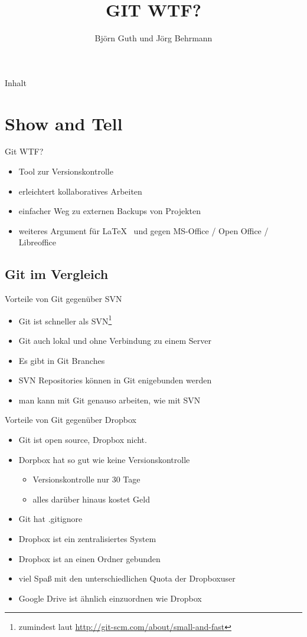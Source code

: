 \documentclass{beamer}
\title{GIT WTF?}
\author{Björn Guth und Jörg Behrmann}
\begin{document}
\frame[plain]{\titlepage}

\begin{frame}{Inhalt}
	\tableofcontents
\end{frame}

\section{Show and Tell}
\begin{frame}{Git WTF?}
	\begin{itemize}
		\item Tool zur Versionskontrolle
		\item erleichtert kollaboratives Arbeiten
		\item einfacher Weg zu externen Backups von Projekten
		\item weiteres Argument für \LaTeX~ und gegen MS-Office / Open Office / Libreoffice
	\end{itemize}
\end{frame}

\subsection{Git im Vergleich}
\begin{frame}{Vorteile von Git gegenüber SVN}
	\begin{itemize}
		\item Git ist schneller als SVN\footnote{zumindest laut \url{http://git-scm.com/about/small-and-fast}}
		\item Git auch lokal und ohne Verbindung zu einem Server
		\item Es gibt in Git Branches
		\item SVN Repositories können in Git enigebunden werden
		\item man kann mit Git genauso arbeiten, wie mit SVN
	\end{itemize}
\end{frame}

\begin{frame}{Vorteile von Git gegenüber Dropbox}
	\begin{itemize}
		\item Git ist open source, Dropbox nicht.
		\item Dorpbox hat so gut wie keine Versionskontrolle
			\begin{itemize}
				\item Versionskontrolle nur 30 Tage
				\item alles darüber hinaus kostet Geld
			\end{itemize}
		\item Git hat .gitignore
		\item Dropbox ist ein zentralisiertes System
		\item Dropbox ist an einen Ordner gebunden
		\item viel Spaß mit den unterschiedlichen Quota der Dropboxuser
		\item Google Drive ist ähnlich einzuordnen wie Dropbox
	\end{itemize}
\end{frame}
\end{document}
